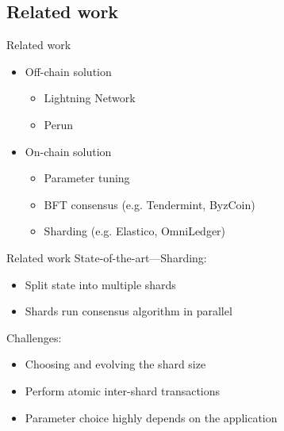 \documentclass{beamer}
\begin{document}
\subsection{Related work}
\begin{frame}{Related work}
    \begin{itemize}
        \item Off-chain solution
            \begin{itemize}
                \item Lightning Network
                \item Perun
            \end{itemize}
        \item On-chain solution
            \begin{itemize}
                \item Parameter tuning
                \item BFT consensus (e.g. Tendermint, ByzCoin)
                \item Sharding (e.g. Elastico, OmniLedger)
            \end{itemize}
    \end{itemize}
\end{frame}

\begin{frame}{Related work}
  State-of-the-art---Sharding:
  \begin{itemize}
  \item Split state into multiple shards
  \item Shards run consensus algorithm in parallel
  \end{itemize}
  Challenges:
  \begin{itemize}
      \item Choosing and evolving the shard size
      \item Perform atomic inter-shard transactions
      \item Parameter choice highly depends on the application
  \end{itemize}
\end{frame}
\end{document}
